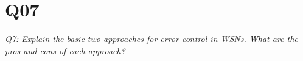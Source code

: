 \chapter{Q07}
\emph{Q7: Explain the basic two approaches for error control in WSNs. What are
the pros and cons of each approach?}
